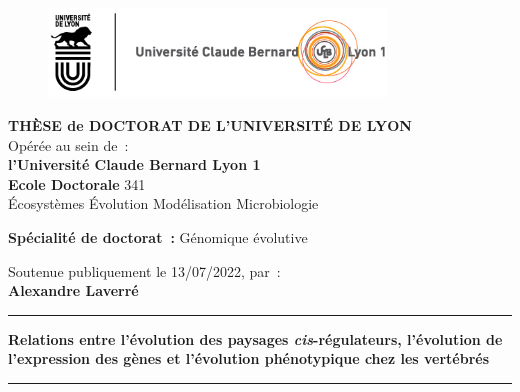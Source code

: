 \thispagestyle{empty}

\unitlength 1cm
\begin{center}
    \vspace*{-2.5cm}
    \begin{figure}[h]
        \centering
        \includegraphics[width=0.8\textwidth]{figures/Logo_Lyon_UCBL.jpg}
    \end{figure}

    {\large \textbf{THÈSE de DOCTORAT DE L'UNIVERSITÉ DE LYON}\\}
    {Opérée au sein de~:\\}
    {\large \textbf{l'Université Claude Bernard Lyon 1}\\}
    \vspace{12pt}
    {\large \textbf{Ecole Doctorale} 341 \\
    \vspace{0.15cm}
    Écosystèmes Évolution Modélisation Microbiologie
    }
    
    \vspace{12pt}
    {\large \textbf{Spécialité de doctorat~:} Génomique évolutive
    \\}
    \vspace{0.8cm}

    {Soutenue publiquement le 13/07/2022, par~:\\}
    \vspace{0.15cm}
    {\Large \textbf{Alexandre Laverré}\\}
    \vspace{0.5cm}
    \rule{5cm}{1pt}
    
    \vspace{12pt}
    {\Large \textbf{Relations entre l’évolution des paysages \textit{cis}-régulateurs, l’évolution de l’expression des gènes et l’évolution phénotypique chez les vertébrés}\par}
    \vspace{12pt}
    \rule{5cm}{1pt}
    \vspace{0.5cm}

\end{center}

